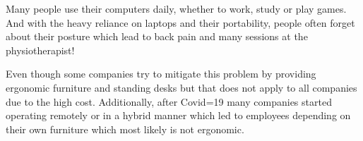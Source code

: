 Many people use their computers daily, whether to work, study or play games.
And with the heavy reliance on laptops and their portability, people often forget about
their posture which lead to back pain and many sessions at the physiotherapist!

Even though some companies try to mitigate this problem by providing ergonomic furniture
and standing desks but that does not apply to all companies due to the high cost. 
Additionally, after Covid=19 many companies started operating remotely or in a hybrid manner 
which led to employees depending on their own furniture which most likely is not ergonomic.


